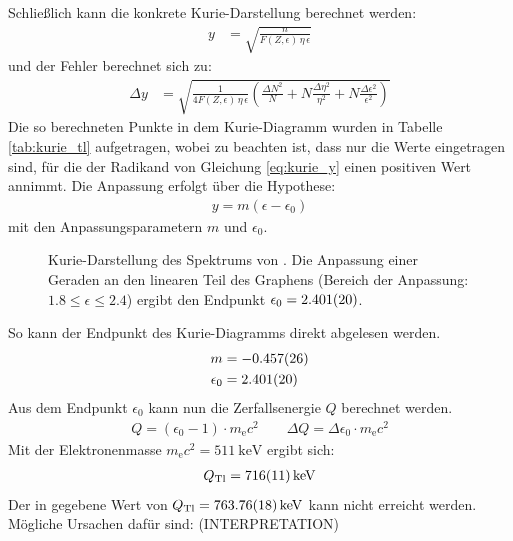 \documentclass[11pt, a4paper]{article}
\numberwithin{equation}{section}
\begin{document}
Schließlich kann die konkrete Kurie-Darstellung berechnet werden:
\begin{align}
	y &= \sqrt{\frac{n}{F(Z,\epsilon) \, \eta \, \epsilon}}
	\label{eq:kurie_y}
\end{align}
und der Fehler berechnet sich zu:
\begin{align}
	\Delta y &= 
	\sqrt{\frac{1}{4 F(Z, \epsilon) \, \eta \, \epsilon}
	\left( \frac{\Delta N^2}{N} + N \frac{\Delta \eta^2}{\eta^2} + N \frac{\Delta \epsilon^2}{\epsilon^2} \right)
	}
\end{align}
Die so berechneten Punkte in dem Kurie-Diagramm wurden in Tabelle \ref{tab:kurie_tl} aufgetragen, wobei zu beachten ist, dass nur die Werte eingetragen sind, für die der Radikand von Gleichung \eqref{eq:kurie_y} einen positiven Wert annimmt.
Die Anpassung erfolgt über die Hypothese:
\begin{align}
	y = m (\epsilon - \epsilon_0)
\end{align}
mit den Anpassungsparametern $m$ und $\epsilon_0$.
\begin{figure}[h]
	\centering
	
	\caption{Kurie-Darstellung des Spektrums von . Die Anpassung einer Geraden an den linearen Teil des Graphens (Bereich der Anpassung: $\num{1.8} \leq \epsilon \leq {2.4}$) ergibt den Endpunkt $\epsilon_0 = \num{2.401 +- 0.020}$.}
	\label{fig:thallium_kurie}
\end{figure}
So kann der Endpunkt des Kurie-Diagramms direkt abgelesen werden.
\begin{align}
	m &= \num{-0.457 +- 0.026} \\
	\epsilon_0 &= \num{2.401 +- 0.020}
\end{align}
Aus dem Endpunkt $\epsilon_0$ kann nun die Zerfallsenergie $Q$ berechnet werden.
\begin{align}
	Q = (\epsilon_0 - 1) \cdot m_\mathrm{e} c^2 \qquad
	\Delta Q = \Delta \epsilon_0 \cdot m_\mathrm{e} c^2
	\label{eq:zerfallsenergie}
\end{align}
Mit der Elektronenmasse $m_\mathrm{e} c^2 = \SI{511}{\kilo\electronvolt}$ ergibt sich:
\begin{align}
	Q_\mathrm{Tl} = \SI{716 +- 11}{\kilo\electronvolt}
\end{align}
Der in \cite{tl_literatur} gegebene Wert von $Q_\mathrm{Tl} = \SI{763.76 +- 0.18}{\kilo\electronvolt}$ kann nicht erreicht werden.
Mögliche Ursachen dafür sind:
(INTERPRETATION)
\FloatBarrier
\end{document}

